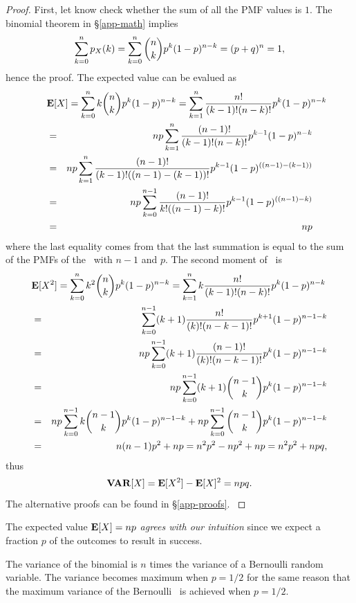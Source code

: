 	\begin{proof}
		First, let know check whether the sum of all the PMF values is $1$.
		The binomial theorem in \S\ref{app-math} implies
		\[
			\sum_{k=0}^{n} p_{X}(k)
			= \sum_{k=0}^{n} {{n} \choose {k}} p^k (1-p)^{n-k}
			= (p+q)^n =1,
		\]
		hence the proof.
		The expected value can be evalued as
		\begin{eqnarray*}
			\lefteqn{
			\Exp{X} = \sumto{k}{0}{n} k \chs{n}{k} p^k (1-p)^{n-k}
			= \sumto{k}{1}{n} \frac{n!}{(k-1)!(n-k)!} p^k (1-p)^{n-k}
			}
			\\ &=&
			np \sumto{k}{1}{n} \frac{(n-1)!}{(k-1)!(n-k)!} p^{k-1} (1-p)^{n-k}
			\\ &=&
			np \sumto{k}{1}{n} \frac{(n-1)!}{(k-1)!((n-1)-(k-1))!} p^{k-1} (1-p)^{((n-1)-(k-1))}
			\\ &=&
			np \sumto{k}{0}{n-1} \frac{(n-1)!}{k!((n-1)-k)!} p^{k-1} (1-p)^{((n-1)-k)}
			\\ &=&
			np
		\end{eqnarray*}
		where the last equality comes from 
		that the last summation is equal to
		the sum of the PMFs of the \binomrv\ with $n-1$ and $p$.
		The second moment of \X\ is
		\begin{eqnarray*}
			\lefteqn{
			\Exp{X^2} = \sumto{k}{0}{n} k^2 \chs{n}{k} p^k (1-p)^{n-k}
			= \sumto{k}{1}{n} k \frac{n!}{(k-1)!(n-k)!} p^k (1-p)^{n-k}
			}
			\\ &=&
			\sumto{k}{0}{n-1} (k+1) \frac{n!}{(k)!(n-k-1)!} p^{k+1} (1-p)^{n-1-k}
			\\ &=&
			np \sumto{k}{0}{n-1} (k+1) \frac{(n-1)!}{(k)!(n-k-1)!} p^{k} (1-p)^{n-1-k}
			\\ &=&
			np \sumto{k}{0}{n-1} (k+1) \chs{n-1}{k} p^{k} (1-p)^{n-1-k}
			\\ &=&
			np \sumto{k}{0}{n-1} k \chs{n-1}{k} p^{k} (1-p)^{n-1-k}
			+ np \sumto{k}{0}{n-1} \chs{n-1}{k} p^{k} (1-p)^{n-1-k}
			\\ &=&
			n(n-1)p^2 + np
			= n^2p^2 -np^2 + np
			= n^2p^2 +npq,
		\end{eqnarray*}
		thus
		\[
			{\bf VAR}[X] = {\bf E}[X^2] - {\bf E}[X]^2 = npq.
		\]
		The alternative proofs can be found in \S\ref{app-proofs}.
		\label{loc-binom-alter-proof}
	\end{proof}

	\item The expected value ${\bf E}[X] = np$
	\emph{agrees with our intuition}
	since we expect a fraction $p$ of the outcomes to result in success.

	\item The variance of the binomial is $n$ times
	the variance of a Bernoulli random variable.
	The variance becomes maximum when $p=1/2$
	for the same reason that the maximum variance of the Bernoulli \randvar\
	is achieved when $p=1/2$.

